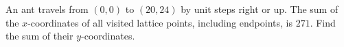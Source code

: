 An ant travels from $(0,0)$ to $(20,24)$ by unit steps right or up. The sum of the $x$-coordinates of all visited lattice points, including endpoints, is $271$. Find the sum of their $y$-coordinates.
